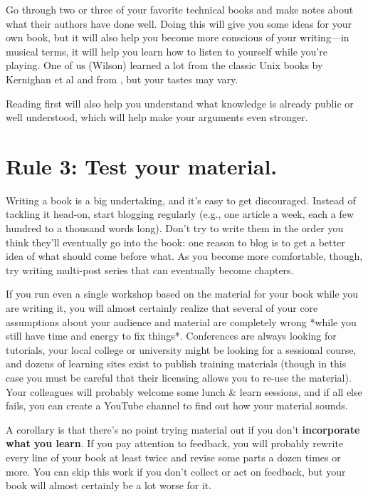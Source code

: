 \documentclass[10pt,letterpaper]{article}
\begin{document}
Go through two or three of your favorite technical books
and make notes about what their authors have done well.
Doing this will give you some ideas for your own book,
but it will also help you become more conscious of your writing—in musical terms,
it will help you learn how to listen to yourself while you're playing.
One of us (Wilson) learned a lot from the classic Unix books by Kernighan et al
\cite{Ke1979,Ke1981,Ke1983,Ke1988} and from \cite{Ud1999},
but your tastes may vary.

Reading first will also help you understand what knowledge is already public or well understood,
which will help make your arguments even stronger. 

\section*{Rule 3: Test your material.}

Writing a book is a big undertaking, and it's easy to get discouraged.
Instead of tackling it head-on,
start blogging regularly
(e.g.,
one article a week, each a few hundred to a thousand words long).
Don't try to write them in the order you think they'll eventually go into the book:
one reason to blog is to get a better idea of what should come before what.
As you become more comfortable,
though,
try writing multi-post series that can eventually become chapters.

If you run even a single workshop based on the material for your book
while you are writing it,
you will almost certainly realize that
several of your core assumptions about your audience and material are completely wrong
*while you still have time and energy to fix things*.
Conferences are always looking for tutorials,
your local college or university might be looking for a sessional course,
and dozens of learning sites exist to publish training materials
(though in this case you must be careful that
their licensing allows you to re-use the material).
Your colleagues will probably welcome some lunch \& learn sessions,
and if all else fails,
you can create a YouTube channel to find out how your material sounds.

A corollary is that
there's no point trying material out if you don't \textbf{incorporate what you learn}.
If you pay attention to feedback,
you will probably rewrite every line of your book at least twice
and revise some parts a dozen times or more.
You can skip this work if you don't collect or act on feedback,
but your book will almost certainly be a lot worse for it.
\end{document}

